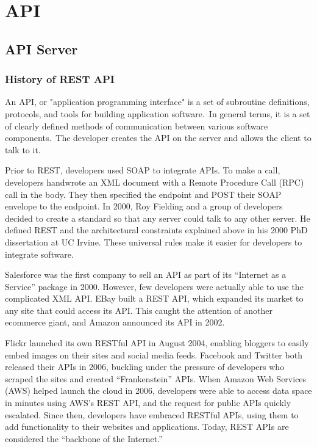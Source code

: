 \section{API}
\subsection{API Server}
\subsubsection{History of REST API}

\hspace{2cm}An API, or "application programming interface" is a set of subroutine definitions, protocols, and tools for building application software.\
 In general terms, it is a set of clearly defined methods of communication between various software components.\
 The developer creates the API on the server and allows the client to talk to it.
 
 
Prior to REST, developers used SOAP to integrate APIs. To make a call, developers handwrote an XML document with a Remote Procedure Call (RPC) call in the body. They then specified the endpoint and POST their SOAP envelope to the endpoint.
In 2000, Roy Fielding and a group of developers decided to create a standard so that any server could talk to any other server. He defined REST and the architectural constraints explained above in his 2000 PhD dissertation at UC Irvine. These universal rules make it easier for developers to integrate software.

Salesforce was the first company to sell an API as part of its “Internet as a Service” package in 2000. However, few developers were actually able to use the complicated XML API. EBay built a REST API, which expanded its market to any site that could access its API. This caught the attention of another ecommerce giant, and Amazon announced its API in 2002.

Flickr launched its own RESTful API in August 2004, enabling bloggers to easily embed images on their sites and social media feeds. Facebook and Twitter both released their APIs in 2006, buckling under the pressure of developers who scraped the sites and created “Frankenstein” APIs. When Amazon Web Services (AWS) helped launch the cloud in 2006, developers were able to access data space in minutes using AWS’s REST API, and the request for public APIs quickly escalated.
Since then, developers have embraced RESTful APIs, using them to add functionality to their websites and applications. Today, REST APIs are considered the “backbone of the Internet.”\cite{web004}
\newline \newline

